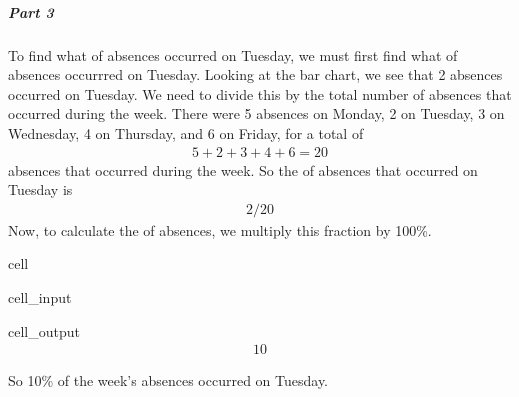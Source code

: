 \documentclass[letterpaper,10pt,english]{jupyterBook}
\begin{document}
\subparagraph{Part 3}
\label{\detokenize{Ch1 Sampling and Data/1.4 Tables and Charts:part-3}}
\sphinxAtStartPar
To find what  of absences occurred on Tuesday, we must first find what  of absences occurrred on Tuesday. Looking at the bar chart, we see that 2 absences occurred on Tuesday. We need to divide this by the total number of absences that occurred during the week. There were 5 absences on Monday, 2 on Tuesday, 3 on Wednesday, 4 on Thursday, and 6 on Friday, for a total of
\begin{equation*}
\begin{split}5 + 2 + 3 + 4 + 6 = 20\end{split}
\end{equation*}
\sphinxAtStartPar
absences that occurred during the week. So the  of absences that occurred on Tuesday is
\begin{equation*}
\begin{split} 2/20 \end{split}
\end{equation*}
\sphinxAtStartPar
Now, to calculate the  of absences, we multiply this fraction by 100\%.

\begin{sphinxuseclass}{cell}\begin{sphinxVerbatimInput}

\begin{sphinxuseclass}{cell_input}
\begin{sphinxVerbatim}[commandchars=\\\{\}]
\end{sphinxVerbatim}

\end{sphinxuseclass}\end{sphinxVerbatimInput}
\begin{sphinxVerbatimOutput}

\begin{sphinxuseclass}{cell_output}\begin{equation*}
\begin{split}10\end{split}
\end{equation*}
\end{sphinxuseclass}\end{sphinxVerbatimOutput}

\end{sphinxuseclass}
\sphinxAtStartPar
So 10\% of the week’s absences occurred on Tuesday.
\end{document}
